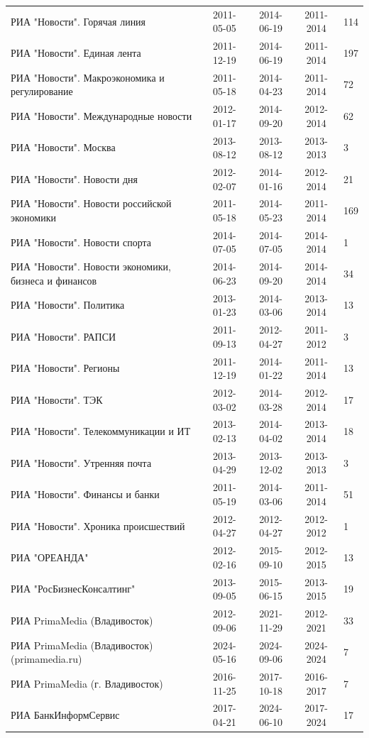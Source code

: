 \begin{longtable}{p{6cm}cccp{2cm}}
РИА "Новости". Горячая линия & 2011-05-05 & 2014-06-19 & 2011-2014 & 114\\
РИА "Новости". Единая лента & 2011-12-19 & 2014-06-19 & 2011-2014 & 197\\
РИА "Новости". Макроэкономика и регулирование & 2011-05-18 & 2014-04-23 & 2011-2014 & 72\\
РИА "Новости". Международные новости & 2012-01-17 & 2014-09-20 & 2012-2014 & 62\\
РИА "Новости". Москва & 2013-08-12 & 2013-08-12 & 2013-2013 & 3\\
РИА "Новости". Новости дня & 2012-02-07 & 2014-01-16 & 2012-2014 & 21\\
РИА "Новости". Новости российской экономики & 2011-05-18 & 2014-05-23 & 2011-2014 & 169\\
РИА "Новости". Новости спорта & 2014-07-05 & 2014-07-05 & 2014-2014 & 1\\
РИА "Новости". Новости экономики, бизнеса и финансов & 2014-06-23 & 2014-09-20 & 2014-2014 & 34\\
РИА "Новости". Политика & 2013-01-23 & 2014-03-06 & 2013-2014 & 13\\
РИА "Новости". РАПСИ & 2011-09-13 & 2012-04-27 & 2011-2012 & 3\\
РИА "Новости". Регионы & 2011-12-19 & 2014-01-22 & 2011-2014 & 13\\
РИА "Новости". ТЭК & 2012-03-02 & 2014-03-28 & 2012-2014 & 17\\
РИА "Новости". Телекоммуникации и ИТ & 2013-02-13 & 2014-04-02 & 2013-2014 & 18\\
РИА "Новости". Утренняя почта & 2013-04-29 & 2013-12-02 & 2013-2013 & 3\\
РИА "Новости". Финансы и банки & 2011-05-19 & 2014-03-06 & 2011-2014 & 51\\
РИА "Новости". Хроника происшествий & 2012-04-27 & 2012-04-27 & 2012-2012 & 1\\
РИА "ОРЕАНДА" & 2012-02-16 & 2015-09-10 & 2012-2015 & 13\\
РИА "РосБизнесКонсалтинг" & 2013-09-05 & 2015-06-15 & 2013-2015 & 19\\
РИА PrimaMedia (Владивосток) & 2012-09-06 & 2021-11-29 & 2012-2021 & 33\\
РИА PrimaMedia (Владивосток) (primamedia.ru) & 2024-05-16 & 2024-09-06 & 2024-2024 & 7\\
РИА PrimaMedia (г. Владивосток) & 2016-11-25 & 2017-10-18 & 2016-2017 & 7\\
РИА БанкИнформСервис & 2017-04-21 & 2024-06-10 & 2017-2024 & 17\\

\end{longtable}

